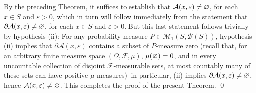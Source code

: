 By the preceding Theorem, it suffices to establish that
$\mathcal{A}(x,\varepsilon) \neq \varnothing$, for each $x \in S$ and $\varepsilon > 0$,
which in turn will follow immediately from the statement that
$\partial\mathcal{A}(x,\varepsilon) \neq \varnothing$, for each $x \in S$ and $\varepsilon > 0$.
But this last statement follows trivially by hypothesis (ii): For any probability measure
$P \in \mathcal{M}_{1}\!\left(S,\mathcal{B}(S)\right)$, hypothesis (ii) implies that
$\partial\mathcal{A}(x,\varepsilon)$ contains a subset of $P$-measure zero
(recall that, for an arbitrary finite measure space $\left(\Omega,\mathcal{F},\mu\right)$,
$\mu(\varnothing) = 0$, and in every uncountable collection of disjoint
$\mathcal{F}$-measurable sets, at most countably many of these sets can have positive $\mu$-measures);
in particular, (ii) implies $\partial\mathcal{A}(x,\varepsilon) \neq \varnothing$,
hence $\mathcal{A}(x,\varepsilon) \neq \varnothing$.
This completes the proof of the present Theorem.
\qed
